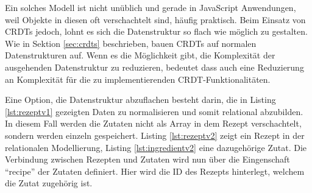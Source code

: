 \documentclass[a4paper, 12pt]{scrreprt}
\begin{document}


\begin{minipage}{\linewidth}
	
\end{minipage} 

Ein solches Modell ist nicht unüblich und gerade in JavaScript Anwendungen, weil Objekte in diesen oft verschachtelt sind, häufig praktisch. Beim Einsatz von CRDTs jedoch, lohnt es sich die Datenstruktur so flach wie möglich zu gestalten. Wie in Sektion \ref{sec:crdts} beschrieben, bauen CRDTs auf normalen Datenstrukturen auf. Wenn es die Möglichkeit gibt, die Komplexität der ausgehenden Datenstruktur zu reduzieren, bedeutet dass auch eine Reduzierung an Komplexität für die zu implementierenden CRDT-Funktionalitäten.

Eine Option, die Datenstruktur abzuflachen besteht darin, die in Listing \ref{lst:rezeptv1} gezeigten Daten zu normalisieren und somit relational abzubilden. In diesem Fall werden die Zutaten nicht als Array in dem Rezept verschachtelt, sondern werden einzeln gespeichert. Listing \ref{lst:rezeptv2} zeigt ein Rezept in der relationalen Modellierung, Listing \ref{lst:ingredientv2} eine dazugehörige Zutat. Die Verbindung zwischen Rezepten und Zutaten wird nun über die Eingenschaft \enquote{recipe} der Zutaten definiert. Hier wird die ID des Rezepts hinterlegt, welchem die Zutat zugehörig ist.


\begin{minipage}{\linewidth}
	
\end{minipage}
\end{document}
